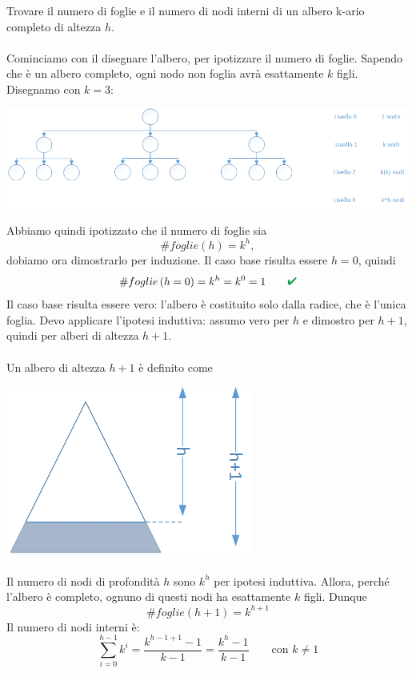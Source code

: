 \documentclass[italian]{article}
\renewcommand{\checkmark}{\textcolor{ForestGreen}{\text{\ding{52}}}}
\newcommand{\leaves}[1]{\text{$\#foglie\left(#1\right)$}}
\newcommand{\exercize}{\text{\faPencil $\;$ Esercizio }}
\begin{document}
\subsubsection{\exercize}
Trovare il numero di foglie e il numero di nodi interni di un albero k-ario completo di altezza $h$.\\\\
Cominciamo con il disegnare l'albero, per ipotizzare il numero di foglie. Sapendo che è un albero completo, ogni nodo non foglia avrà esattamente $k$ figli. Disegnamo con $k=3$:
\begin{center}
\includegraphics[width=\linewidth]{"images/albero_completo"}
\end{center}
Abbiamo quindi ipotizzato che il numero di foglie sia
\[
	\leaves{h} = k^h,
\]
dobiamo ora dimostrarlo per induzione. Il caso base risulta essere $h=0$, quindi
\[
	\leaves{h=0} = k^h = k^0 = 1 \qquad\checkmark
\]
Il caso base risulta essere vero: l'albero è costituito solo dalla radice, che è l'unica foglia. Devo applicare l'ipotesi induttiva: assumo vero per $h$ e dimostro per $h+1$, quindi per alberi di altezza $h+1$. \\\\
Un albero di altezza $h+1$ è definito come
\begin{center}
	\includegraphics[width=0.2\linewidth]{"images/albero_altezza"}
\end{center}
Il numero di nodi di profondità $h$ sono $k^h$ per ipotesi induttiva. Allora, perché l'albero è completo, ognuno di questi nodi ha esattamente $k$ figli. Dunque
\[
	\leaves{h+1} = k^{h+1}
\]
Il numero di nodi interni è:
\[
	\sum_{i=0}^{h-1}k^i = \dfrac{k^{h-1+1}-1}{k-1} = \dfrac{k^h-1}{k-1} \qquad \text{con $k \neq 1$}
\]
\pagebreak
\end{document}

